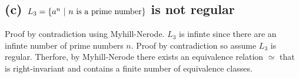 \documentclass[12pt]{article}
\begin{document}
\subsection*{(c) $L_3 = \{a^n\ |\ n \textnormal{ is a prime number}\}$
\textnormal{is} not \textnormal{regular}}
Proof by contradiction using Myhill-Nerode. $L_3$ is infinte since there are
an infinte number of prime numbers $n$. Proof by contradiction so assume $L_3$
is regular. Therfore, by Myhill-Nerode there exists an equivalence relation
$\simeq$ that is right-invariant and contains a finite number of equivalence
classes.
\end{document}
